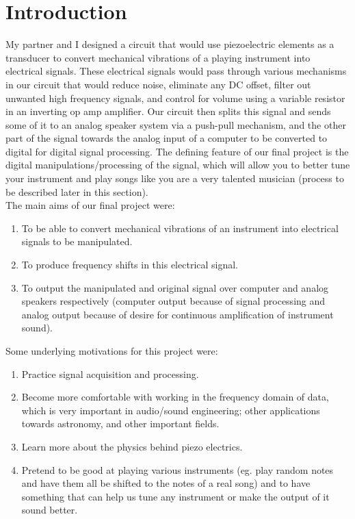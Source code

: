 \documentclass{article}
\begin{document}
\section{Introduction}
    My partner and I designed a circuit that would use piezoelectric elements as a transducer to convert mechanical vibrations of a playing instrument into electrical signals. These electrical signals would pass through various mechanisms in our circuit that would reduce noise, eliminate any DC offset, filter out unwanted high frequency signals, and control for volume using a variable resistor in an inverting op amp amplifier. Our circuit then splits this signal and sends some of it to an analog speaker system via a push-pull mechanism, and the other part of the signal towards the analog input of a computer to be converted to digital for digital signal processing. The defining feature of our final project is the digital manipulations/processing of the signal, which will allow you to better tune your instrument and play songs like you are a very talented musician (process to be described later in this section). 
    \\\indent The main aims of our final project were: 
    \begin{enumerate}
        \item To be able to convert mechanical vibrations of an instrument into electrical signals to be manipulated.
        \item To produce frequency shifts in this electrical signal. 
        \item To output the manipulated and original signal over computer and analog speakers respectively (computer output because of signal processing and analog output because of desire for continuous amplification of instrument sound).
    \end{enumerate}
    \indent Some underlying motivations for this project were:
    \begin{enumerate}
        \item Practice signal acquisition and processing.
        \item Become more comfortable with working in the frequency domain of data, which is very important in audio/sound engineering; other applications towards astronomy, and other important fields.
        \item Learn more about the physics behind piezo electrics.
        \item Pretend to be good at playing various instruments (eg. play random notes and have them all be shifted to the notes of a real song) and to have something that can help us tune any instrument or make the output of it sound better.
    \end{enumerate}
\end{document}
